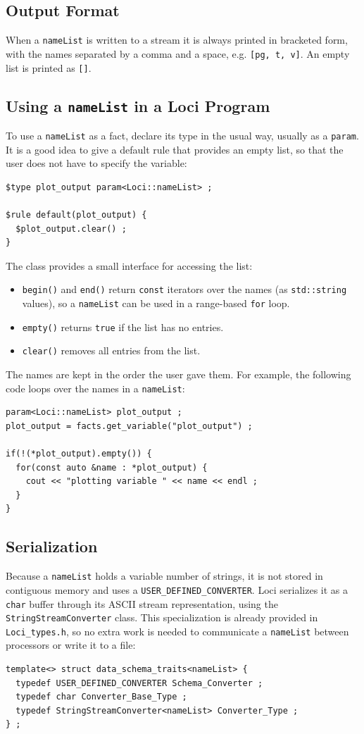 \subsection {Output Format}
%
When a {\tt nameList} is written to a stream it is always printed in
bracketed form, with the names separated by a comma and a space,
e.g. {\tt [pg, t, v]}.  An empty list is printed as {\tt []}.
%
\subsection {Using a {\tt nameList} in a Loci Program}
%
To use a {\tt nameList} as a fact, declare its type in the usual way,
usually as a {\tt param}.  It is a good idea to give a default rule
that provides an empty list, so that the user does not have to
specify the variable:
\begin{verbatim}
$type plot_output param<Loci::nameList> ;

$rule default(plot_output) {
  $plot_output.clear() ;
}
\end{verbatim}
%
The class provides a small interface for accessing the list:
\begin{itemize}
\item {\tt begin()} and {\tt end()} return {\tt const} iterators over the
  names (as {\tt std::string} values), so a {\tt nameList} can be used
  in a range-based {\tt for} loop.
\item {\tt empty()} returns {\tt true} if the list has no entries.
\item {\tt clear()} removes all entries from the list.
\end{itemize}
The names are kept in the order the user gave them.  For example, the
following code loops over the names in a {\tt nameList}:
\begin{verbatim}
param<Loci::nameList> plot_output ;
plot_output = facts.get_variable("plot_output") ;

if(!(*plot_output).empty()) {
  for(const auto &name : *plot_output) {
    cout << "plotting variable " << name << endl ;
  }
}
\end{verbatim}
%
\subsection {Serialization}
%
Because a {\tt nameList} holds a variable number of strings, it is not
stored in contiguous memory and uses a {\tt USER\_DEFINED\_CONVERTER}.
Loci serializes it as a {\tt char} buffer through its ASCII stream
representation, using the {\tt StringStreamConverter} class.  This
specialization is already provided in {\tt Loci\_types.h}, so no extra
work is needed to communicate a {\tt nameList} between processors or
write it to a file:
\begin{verbatim}
template<> struct data_schema_traits<nameList> {
  typedef USER_DEFINED_CONVERTER Schema_Converter ;
  typedef char Converter_Base_Type ;
  typedef StringStreamConverter<nameList> Converter_Type ;
} ;
\end{verbatim}
%
